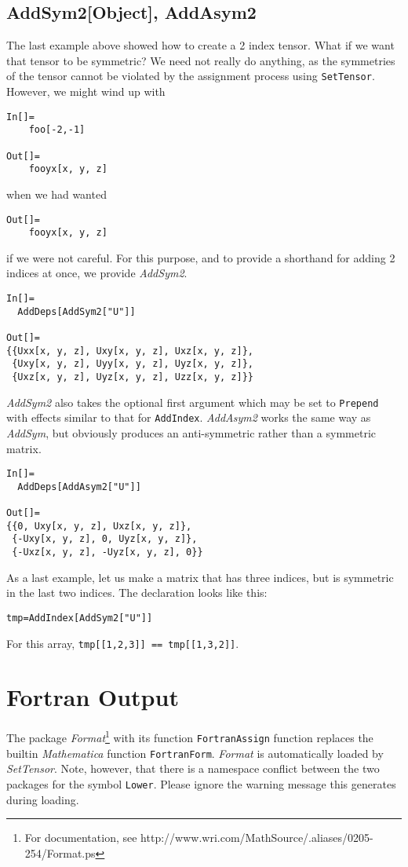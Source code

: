 \subsection{AddSym2[Object], AddAsym2}
The last example above showed how to create a 2 index tensor.  What
if we want that tensor to be symmetric?  We need not really do anything,
as the symmetries of the tensor cannot be violated by the assignment
process using {\tt SetTensor}.  However, we might wind up with
\begin{verbatim}
In[]=
    foo[-2,-1]

Out[]=
    fooyx[x, y, z]
\end{verbatim}
when we had wanted
\begin{verbatim}
Out[]=
    fooyx[x, y, z]
\end{verbatim}
if we were not careful.
For this purpose, and to provide a shorthand for adding 2 indices at once, we provide
{\it AddSym2}.
\begin{verbatim}
In[]=
  AddDeps[AddSym2["U"]]

Out[]=
{{Uxx[x, y, z], Uxy[x, y, z], Uxz[x, y, z]}, 
 {Uxy[x, y, z], Uyy[x, y, z], Uyz[x, y, z]}, 
 {Uxz[x, y, z], Uyz[x, y, z], Uzz[x, y, z]}}
\end{verbatim}
{\it AddSym2} also takes the optional first argument which may be
set to {\tt Prepend} with effects similar to that for {\tt AddIndex}.
{\it AddAsym2} works the same way as {\it AddSym}, but obviously
produces an anti-symmetric rather than a symmetric matrix.
\begin{verbatim}
In[]=
  AddDeps[AddAsym2["U"]]

Out[]=
{{0, Uxy[x, y, z], Uxz[x, y, z]}, 
 {-Uxy[x, y, z], 0, Uyz[x, y, z]}, 
 {-Uxz[x, y, z], -Uyz[x, y, z], 0}}
\end{verbatim}
As a last example, let us make a matrix that has three indices, but is
symmetric in the last two indices.  The declaration looks like this:
\begin{verbatim}
tmp=AddIndex[AddSym2["U"]]
\end{verbatim}
For this array, {\tt tmp[[1,2,3]] == tmp[[1,3,2]]}.

\section{Fortran Output}
The package {\it Format}\footnote{For documentation, see
http://www.wri.com/MathSource/.aliases/0205-254/Format.ps}
with its function {\tt FortranAssign} function replaces
the builtin {\it Mathematica} function {\tt FortranForm}.  {\it Format} is automatically
loaded by {\it SetTensor}.  Note, however, that there is a namespace conflict between
the two packages for the symbol {\tt Lower}.  Please ignore the warning message this
generates during loading.

